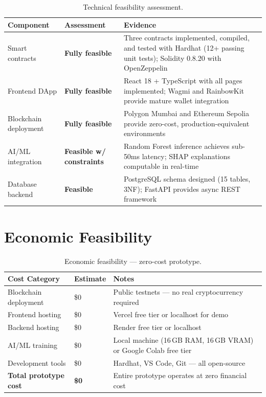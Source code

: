 \documentclass[12pt,a4paper]{report}
\newcommand{\tableheadfont}{\bfseries\small\color{PrimaryBlue}}
\newenvironment{moderntable}[1][H]{%
    \begin{table}[#1]\centering\small%
    \renewcommand{\arraystretch}{1.35}%
}{%
    \end{table}%
}
\begin{document}
\begin{moderntable}
\caption{Technical feasibility assessment.}
\begin{tabular}{@{} >{\raggedright}p{2.5cm} >{\raggedright}p{2.2cm} >{\raggedright\arraybackslash}p{7cm} @{}}
\toprule
\tableheadfont Component & \tableheadfont Assessment & \tableheadfont Evidence \\
\midrule
\rowcolor{RowShade}
Smart contracts & {\color{GreenAccent}\textbf{Fully feasible}} & Three contracts implemented, compiled, and tested with Hardhat (12+ passing unit tests); Solidity 0.8.20 with OpenZeppelin \\
Frontend DApp & {\color{GreenAccent}\textbf{Fully feasible}} & React 18 + TypeScript with all pages implemented; Wagmi and RainbowKit provide mature wallet integration \\
\rowcolor{RowShade}
Blockchain deployment & {\color{GreenAccent}\textbf{Fully feasible}} & Polygon Mumbai and Ethereum Sepolia provide zero-cost, production-equivalent environments \\
AI/ML integration & {\color{AmberAccent}\textbf{Feasible w/ constraints}} & Random Forest inference achieves sub-50ms latency; SHAP explanations computable in real-time \\
\rowcolor{RowShade}
Database backend & {\color{GreenAccent}\textbf{Feasible}} & PostgreSQL schema designed (15 tables, 3NF); FastAPI provides async REST framework \\
\bottomrule
\end{tabular}
\end{moderntable}


\section{Economic Feasibility}

\begin{moderntable}
\caption{Economic feasibility --- zero-cost prototype.}
\begin{tabular}{@{} >{\raggedright}p{3.5cm} >{\raggedright}p{3cm} >{\raggedright\arraybackslash}p{5.5cm} @{}}
\toprule
\tableheadfont Cost Category & \tableheadfont Estimate & \tableheadfont Notes \\
\midrule
\rowcolor{RowShade}
Blockchain deployment & \$0 & Public testnets --- no real cryptocurrency required \\
Frontend hosting & \$0 & Vercel free tier or localhost for demo \\
\rowcolor{RowShade}
Backend hosting & \$0 & Render free tier or localhost \\
AI/ML training & \$0 & Local machine (16\,GB RAM, 16\,GB VRAM) or Google Colab free tier \\
\rowcolor{RowShade}
Development tools & \$0 & Hardhat, VS Code, Git --- all open-source \\
\textbf{Total prototype cost} & \textbf{\$0} & Entire prototype operates at zero financial cost \\
\bottomrule
\end{tabular}
\end{moderntable}
\end{document}
